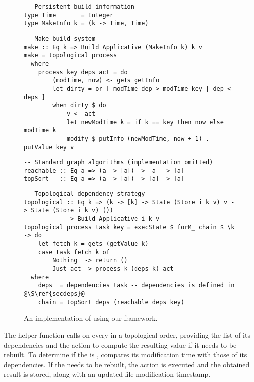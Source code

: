 \begin{figure}
\begin{verbatim}
-- Persistent build information
type Time       = Integer
type MakeInfo k = (k -> Time, Time)
\end{verbatim}
\vspace{1mm}
\begin{verbatim}
-- Make build system
make :: Eq k => Build Applicative (MakeInfo k) k v
make = topological process
  where
    process key deps act = do
        (modTime, now) <- gets getInfo
        let dirty = or [ modTime dep > modTime key | dep <- deps ]
        when dirty $ do
            v <- act
            let newModTime k = if k == key then now else modTime k
            modify $ putInfo (newModTime, now + 1) . putValue key v
\end{verbatim}
\vspace{1mm}
\begin{verbatim}
-- Standard graph algorithms (implementation omitted)
reachable :: Eq a => (a -> [a]) ->  a  -> [a]
topSort   :: Eq a => (a -> [a]) -> [a] -> [a]
\end{verbatim}
\vspace{1mm}
\begin{verbatim}
-- Topological dependency strategy
topological :: Eq k => (k -> [k] -> State (Store i k v) v -> State (Store i k v) ())
            -> Build Applicative i k v
topological process task key = execState $ forM_ chain $ \k -> do
    let fetch k = gets (getValue k)
    case task fetch k of
        Nothing  -> return ()
        Just act -> process k (deps k) act
  where
    deps  = dependencies task -- dependencies is defined in @\S\ref{secdeps}@
    chain = topSort deps (reachable deps key)
\end{verbatim}
\vspace{-2mm}
\caption{An implementation of \Make using our framework.}\label{fig-make-implementation}
\vspace{-2mm}
\end{figure}

The helper function  calls  on every  in
a topological order, providing the list of its dependencies  and the
action  to compute the resulting value if it needs to be rebuilt. To
determine if the  is ,  compares its modification
time with those of its dependencies. If the  needs to be rebuilt, the
action  is executed and the obtained result is stored, along with an
updated file modification timestamp.

